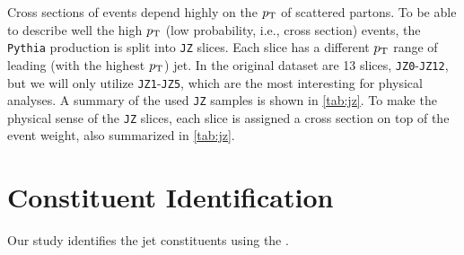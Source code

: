 Cross sections of events depend highly on the $p_\text{T}$ of scattered partons. 
To be able to describe well the high $p_\text{T}$ (low probability, i.e., cross section) events, the \MC \texttt{Pythia} production is split into \texttt{JZ} slices. 
Each slice has a different $p_\text{T}$ range of leading (with the highest $p_\text{T}$) jet.
In the original dataset are 13 slices, \texttt{JZ0}-\texttt{JZ12}, but we will only utilize \texttt{JZ1}-\texttt{JZ5}, which are the most interesting for physical analyses.
A summary of the used \texttt{JZ} samples is shown in \cref{tab:jz}. 
To make the physical sense of the \texttt{JZ} slices, each slice is assigned a cross section on top of the event weight, also summarized in \cref{tab:jz}.



\section{Constituent Identification}
\label{sec:pfo}
Our study identifies the jet constituents using the \PFa \cite{PFO}.

